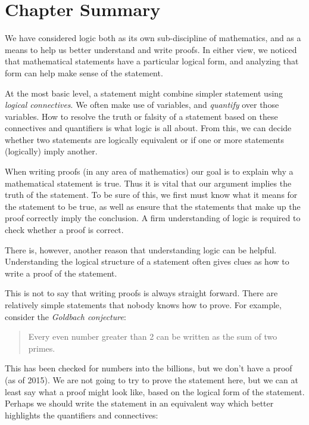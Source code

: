 \documentclass[12pt]{article}
\begin{document}
\section{Chapter Summary}

We have considered logic both as its own sub-discipline of mathematics, and as a means to help us better understand and write proofs.  In either view, we noticed that mathematical statements have a particular logical form, and analyzing that form can help make sense of the statement.  

At the most basic level, a statement might combine simpler statement using \emph{logical connectives}.  We often make use of variables, and \emph{quantify} over those variables.  How to resolve the truth or falsity of a statement based on these connectives and quantifiers is what logic is all about.  From this, we can decide whether two statements are logically equivalent or if one or more statements (logically) imply another.

When writing proofs (in any area of mathematics) our goal is to explain why a mathematical statement is true.  Thus it is vital that our argument implies the truth of the statement.  To be sure of this, we first must know what it means for the statement to be true, as well as ensure that the statements that make up the proof correctly imply the conclusion.  A firm understanding of logic is required to check whether a proof is correct.  

There is, however, another reason that understanding logic can be helpful.  Understanding the logical structure of a statement often gives clues as how to write a proof of the statement.  

This is not to say that writing proofs is always straight forward.  There are relatively simple statements that nobody knows how to prove.  For example, consider the \emph{Goldbach conjecture}:

\begin{quote}
Every even number greater than 2 can be written as the sum of two primes.
\end{quote}

This has been checked for numbers into the billions, but we don't have a proof (as of 2015).  We are not going to try to prove the statement here, but we can at least say what a proof might look like, based on the logical form of the statement.  Perhaps we should write the statement in an equivalent way which better highlights the quantifiers and connectives:
\end{document}
